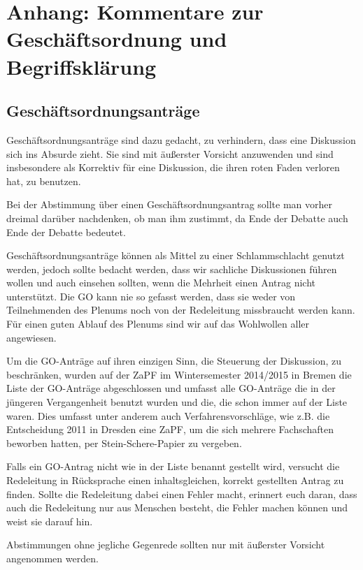 \documentclass[12pt,oneside]{scrartcl}
\begin{document}
\section{Anhang: Kommentare zur Geschäftsordnung und Begriffsklärung%
  \label{anhang-kommentare-zur-geschaftsordnung-und-begriffsklarung}%
}


\subsection{Geschäftsordnungsanträge%
  \label{id1}%
}

Geschäftsordnungsanträge sind dazu gedacht, zu verhindern, dass eine Diskussion
sich ins Absurde zieht. Sie sind mit äußerster Vorsicht anzuwenden und sind
insbesondere als Korrektiv für eine Diskussion, die ihren roten Faden verloren
hat, zu benutzen.

Bei der Abstimmung über einen Geschäftsordnungsantrag sollte man vorher dreimal
darüber nachdenken, ob man ihm zustimmt, da Ende der Debatte auch Ende der Debatte
bedeutet.

Geschäftsordnungsanträge können als Mittel zu einer Schlammschlacht genutzt
werden, jedoch sollte bedacht werden, dass wir sachliche Diskussionen führen
wollen und auch einsehen sollten, wenn die Mehrheit einen Antrag nicht
unterstützt. Die GO kann nie so gefasst werden, dass sie weder von Teilnehmenden
des Plenums noch von der Redeleitung missbraucht werden kann. Für einen guten
Ablauf des Plenums sind wir auf das Wohlwollen aller angewiesen.

Um die GO-Anträge auf ihren einzigen Sinn, die Steuerung der Diskussion, zu
beschränken, wurden auf der ZaPF im Wintersemester 2014/2015 in Bremen die Liste
der GO-Anträge abgeschlossen und umfasst alle GO-Anträge die in der jüngeren
Vergangenheit benutzt wurden und die, die schon immer auf der Liste waren.
Dies umfasst unter anderem auch Verfahrensvorschläge,
wie z.B. die Entscheidung 2011 in Dresden eine ZaPF, um die sich mehrere
Fachschaften beworben hatten, per Stein-Schere-Papier zu vergeben.

Falls ein GO-Antrag nicht wie in der Liste benannt gestellt wird, versucht die
Redeleitung in Rücksprache einen inhaltsgleichen, korrekt gestellten Antrag zu
finden. Sollte die Redeleitung dabei einen Fehler macht, erinnert euch daran,
dass auch die Redeleitung nur aus Menschen besteht, die Fehler machen können und
weist sie darauf hin.

Abstimmungen ohne jegliche Gegenrede sollten nur mit äußerster Vorsicht
angenommen werden.
\end{document}
